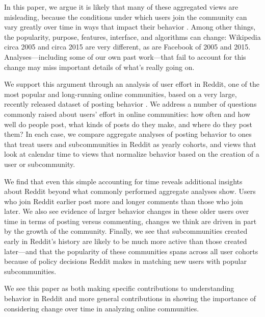 In this paper, we argue it is likely that many of these aggregated views are misleading, because the conditions under which users join the community can vary greatly over time in ways that impact their behavior \cite{Miller2015}.  Among other things, the popularity, purpose, features, interface, and algorithms can change: Wikipedia circa 2005 and circa 2015 are very different, as are Facebook of 2005 and 2015.  Analyses---including some of our own past work---that fail to account for this change may miss important details of what's really going on.

We support this argument through an analysis of user effort in Reddit, one of the most popular and long-running online communities, based on a very large, recently released dataset of posting behavior \cite{}.  We address a number of questions commonly raised about users' effort in online communities: how often and how well do people post, what kinds of posts do they make, and where do they post them?  In each case, we compare aggregate analyses of posting behavior to ones that treat users and subcommunities in Reddit as yearly cohorts, and views that look at calendar time to views that normalize behavior based on the creation of a user or subcommunity.

We find that even this simple accounting for time reveals additional insights about Reddit beyond what commonly performed aggregate analyses show.  Users who join Reddit earlier post more and longer comments than those who join later.  We also see evidence of larger behavior changes in these older users over time in terms of posting versus commenting, changes we think are driven in part by the growth of the community.  Finally, we see that subcommunities created early in Reddit's history are likely to be much more active than those created later---and that the popularity of these communities spans across all user cohorts because of policy decisions Reddit makes in matching new users with popular subcommunities. 

We see this paper as both making specific contributions to understanding behavior in Reddit and more general contributions in showing the importance of considering change over time in analyzing online communities.  

